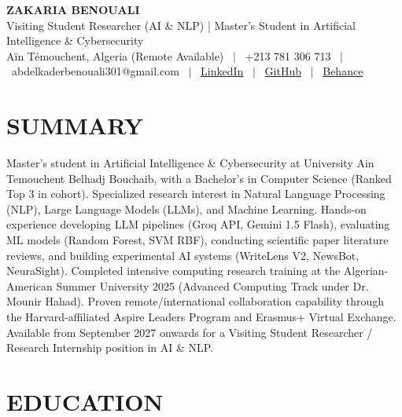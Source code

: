 \documentclass[10.5pt, letterpaper]{article}
\begin{document}
\RaggedRight

\begin{center}
  {\Huge \textbf{ZAKARIA BENOUALI}}\\[4pt]
  {\large Visiting Student Researcher (AI \& NLP) | Master's Student in Artificial Intelligence \& Cybersecurity}\\[4pt]
  Aïn Témouchent, Algeria (Remote Available) \ $|$ \ +213 781 306 713 \ $|$ \ abdelkaderbenouali301@gmail.com \ $|$ \ \href{https://www.linkedin.com/in/benouali-abdelkader-yahia-zakaria-4a917a247}{LinkedIn} \ $|$ \ \href{https://github.com/benoualiabdelkader}{GitHub} \ $|$ \ \href{https://www.behance.net/abdelkaderbeno}{Behance}
\end{center}

\vspace{2pt}

\section{SUMMARY}
Master's student in Artificial Intelligence \& Cybersecurity at University Ain Temouchent Belhadj Bouchaib, with a Bachelor's in Computer Science (Ranked Top 3 in cohort). Specialized research interest in Natural Language Processing (NLP), Large Language Models (LLMs), and Machine Learning. Hands-on experience developing LLM pipelines (Groq API, Gemini 1.5 Flash), evaluating ML models (Random Forest, SVM RBF), conducting scientific paper literature reviews, and building experimental AI systems (WriteLens V2, NewsBot, NeuraSight). Completed intensive computing research training at the Algerian-American Summer University 2025 (Advanced Computing Track under Dr. Mounir Hahad). Proven remote/international collaboration capability through the Harvard-affiliated Aspire Leaders Program and Erasmus+ Virtual Exchange. Available from September 2027 onwards for a Visiting Student Researcher / Research Internship position in AI \& NLP.

\section{EDUCATION}
\end{document}
